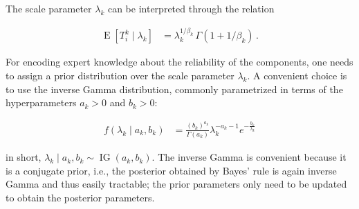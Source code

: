 \documentclass[Journal,letterpaper]{ascelike-new}
\newcommand{\E}{\operatorname{E}}
\newcommand{\ig}{\operatorname{IG}}   %
\begin{document}
The scale parameter $\lambda_k$ can be interpreted through the relation
\begin{linenomath*}
\begin{align}
\E[T_i^k \mid \lambda_k] &= \lambda_k^{1/\beta_k}\, \Gamma(1 + 1/\beta_k)\,.
\label{eq:lambdainterpret}
\end{align}
\end{linenomath*}
For encoding expert knowledge about the reliability of the components,
one needs to assign a prior distribution over the scale parameter $\lambda_k$.
A convenient choice is to use the inverse Gamma distribution,
commonly parametrized in terms of the hyperparameters $a_k > 0$ and $b_k > 0$:
\begin{linenomath*}
\begin{align}
f(\lambda_k\mid a_k,b_k) &= \frac{(b_k)^{a_k}}{\Gamma(a_k)} \lambda_k^{-a_k -1} e^{-\frac{b_k}{\lambda_k}}
\label{eq:ig-def}
\end{align}
\end{linenomath*}
in short, $\lambda_k \mid a_k, b_k \sim \ig(a_k,b_k)$.
The inverse Gamma is convenient because it is a conjugate prior,
i.e., the posterior obtained by Bayes' rule is again inverse Gamma and thus easily tractable;
the prior parameters only need to be updated to obtain the posterior parameters.
\end{document}
